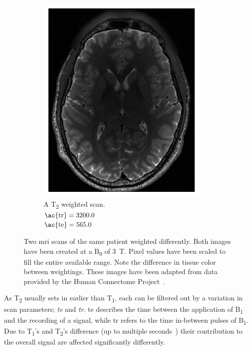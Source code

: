 \begin{figure}[H]
\begin{subfigure}[t]{0.4\textwidth}
        \includegraphics[width=\textwidth]{img/100206_T2.png}
        \caption{A T\textsubscript{2} weighted scan.\\$\text{\ac{tr}} = 3200.0$\\$\text{\ac{te}} = 565.0$}\label{fig:t1_t2_2}
    \end{subfigure}
    \caption{Two \ac{mri} scans of the same patient weighted differently. Both images have been created at a B\textsubscript{0} of \SI{3}{T}. Pixel values have been scaled to fill the entire available range. Note the difference in tissue color between weightings. These images have been adapted from data provided by the Human Connectome Project~\cite{human_connect}.}\label{fig:t1_t2}
\end{figure}

As T\textsubscript{2} usually sets in earlier than T\textsubscript{1}, each can be filtered out by a 
variation in scan parameters; \textit{\acf{te}} and \textit{\acf{tr}}. \ac{te} 
describes the time between the application of B\textsubscript{1} and the recording of a 
signal, while \ac{tr} refers to the time in-between pulses of B\textsubscript{1}. Due to
T\textsubscript{1}'s and T\textsubscript{2}'s difference (up to multiple seconds~\cite[p.~16]{medical_imaging})
their contribution to the overall signal are affected significantly differently.

